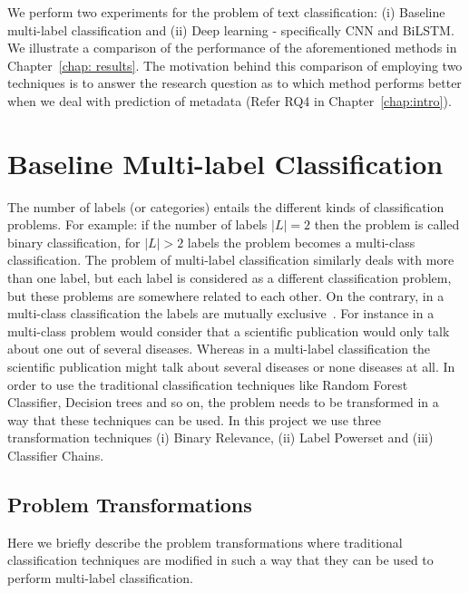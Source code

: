We perform two experiments for the problem of text classification: (i) Baseline multi-label classification and (ii) Deep learning - specifically CNN and BiLSTM. We illustrate a comparison of the performance of the aforementioned methods in Chapter~\ref{chap: results}. The motivation behind this comparison of employing two techniques is to answer the research question as to which method performs better when we deal with prediction of metadata (Refer RQ4 in Chapter~\ref{chap:intro}).

\section{Baseline Multi-label Classification}\label{MLtranform}
The number of labels (or categories) entails the different kinds of classification problems. For example: if the number of labels $|L| = 2$ then the problem is called binary classification, for $|L| > 2$ labels the problem becomes a multi-class classification. The problem of multi-label classification similarly deals with more than one label, but each label is considered as a different classification problem, but these problems are somewhere related to each other. On the contrary, in a multi-class classification the labels are mutually exclusive~\cite{tsoumakas2007multi}. For instance in a multi-class problem would consider that a scientific publication would only talk about one out of several diseases. Whereas in a multi-label classification the scientific publication might talk about several diseases or none diseases at all. 
In order to use the traditional classification techniques like Random Forest Classifier, Decision trees and so on, the problem needs to be transformed in a way that these techniques can be used. In this project we use three transformation techniques (i) Binary Relevance, (ii) Label Powerset and (iii) Classifier Chains. 
\subsection{Problem Transformations}
Here we briefly describe the problem transformations where traditional classification techniques are modified in such a way that they can be used to perform multi-label classification. 
